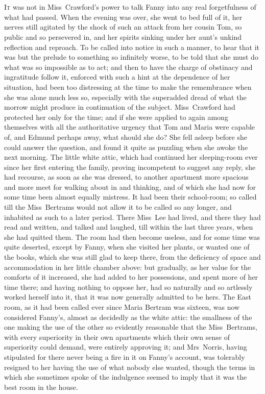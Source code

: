\chapter[Chapter \thechapter]{} 

 \lettrine[lraise=0.3]{I}{t} was not in Miss~Crawford's power to talk Fanny into any real forgetfulness of what had passed. When the evening was over, she went to bed full of it, her nerves still agitated by the shock of such an attack from her cousin Tom, so public and so persevered in, and her spirits sinking under her aunt's unkind reflection and reproach. To be called into notice in such a manner, to hear that it was but the prelude to something so infinitely worse, to be told that she must do what was so impossible as to act; and then to have the charge of obstinacy and ingratitude follow it, enforced with such a hint at the dependence of her situation, had been too distressing at the time to make the remembrance when she was alone much less so, especially with the superadded dread of what the morrow might produce in continuation of the subject. Miss~Crawford had protected her only for the time; and if she were applied to again among themselves with all the authoritative urgency that Tom and Maria were capable of, and Edmund perhaps away, what should she do? She fell asleep before she could answer the question, and found it quite as puzzling when she awoke the next morning. The little white attic, which had continued her sleeping-room ever since her first entering the family, proving incompetent to suggest any reply, she had recourse, as soon as she was dressed, to another apartment more spacious and more meet for walking about in and thinking, and of which she had now for some time been almost equally mistress. It had been their school-room; so called till the Miss~Bertrams would not allow it to be called so any longer, and inhabited as such to a later period. There Miss~Lee had lived, and there they had read and written, and talked and laughed, till within the last three years, when she had quitted them. The room had then become useless, and for some time was quite deserted, except by Fanny, when she visited her plants, or wanted one of the books, which she was still glad to keep there, from the deficiency of space and accommodation in her little chamber above: but gradually, as her value for the comforts of it increased, she had added to her possessions, and spent more of her time there; and having nothing to oppose her, had so naturally and so artlessly worked herself into it, that it was now generally admitted to be hers. The East room, as it had been called ever since Maria Bertram was sixteen, was now considered Fanny's, almost as decidedly as the white attic: the smallness of the one making the use of the other so evidently reasonable that the Miss~Bertrams, with every superiority in their own apartments which their own sense of superiority could demand, were entirely approving it; and Mrs~Norris, having stipulated for there never being a fire in it on Fanny's account, was tolerably resigned to her having the use of what nobody else wanted, though the terms in which she sometimes spoke of the indulgence seemed to imply that it was the best room in the house.

